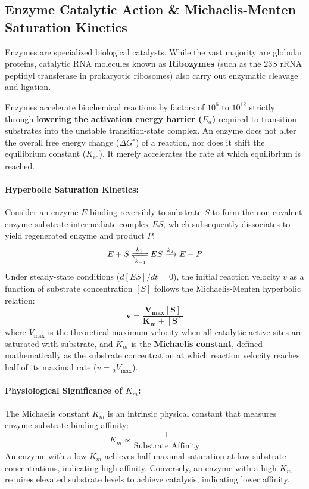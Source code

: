 \documentclass[10pt,twoside,openright]{book}
\begin{document}
\subsection{Enzyme Catalytic Action \& Michaelis-Menten Saturation Kinetics}
Enzymes are specialized biological catalysts. While the vast majority are globular proteins, catalytic RNA molecules known as \textbf{Ribozymes} (such as the $23S$ rRNA peptidyl transferase in prokaryotic ribosomes) also carry out enzymatic cleavage and ligation.

Enzymes accelerate biochemical reactions by factors of $10^6$ to $10^{12}$ strictly through \textbf{lowering the activation energy barrier ($E_a$)} required to transition substrates into the unstable transition-state complex. An enzyme does not alter the overall free energy change ($\Delta G^\circ$) of a reaction, nor does it shift the equilibrium constant ($K_{\mathrm{eq}}$). It merely accelerates the rate at which equilibrium is reached.

\paragraph{Hyperbolic Saturation Kinetics:}
Consider an enzyme $E$ binding reversibly to substrate $S$ to form the non-covalent enzyme-substrate intermediate complex $ES$, which subsequently dissociates to yield regenerated enzyme and product $P$:
\begin{equation}
  E + S \xrightleftharpoons[k_{-1}]{k_1} ES \xrightarrow{k_2} E + P
\end{equation}
Under steady-state conditions ($d[ES]/dt = 0$), the initial reaction velocity $v$ as a function of substrate concentration $[S]$ follows the Michaelis-Menten hyperbolic relation:
\begin{equation}
  \mathbf{v = \frac{V_{\max} [S]}{K_m + [S]}}
\end{equation}
where $V_{\max}$ is the theoretical maximum velocity when all catalytic active sites are saturated with substrate, and $K_m$ is the \textbf{Michaelis constant}, defined mathematically as the substrate concentration at which reaction velocity reaches half of its maximal rate ($v = \frac{1}{2}V_{\max}$).

\paragraph{Physiological Significance of $K_m$:}
The Michaelis constant $K_m$ is an intrinsic physical constant that measures enzyme-substrate binding affinity:
\begin{equation}
  K_m \propto \frac{1}{\text{Substrate Affinity}}
\end{equation}
An enzyme with a low $K_m$ achieves half-maximal saturation at low substrate concentrations, indicating high affinity. Conversely, an enzyme with a high $K_m$ requires elevated substrate levels to achieve catalysis, indicating lower affinity.
\end{document}
